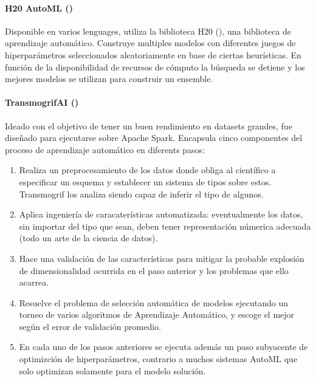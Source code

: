         \paragraph{H20 AutoML (\cite{ledell2020h2o})} Disponible en varios lenguages, utiliza la biblioteca H20 (\cite{boehmke2019hands}), una biblioteca de aprendizaje autom\'atico. Construye multiples modelos con diferentes juegos de hiperpar\'ametros seleccionados aleatoriamente en base de ciertas heur\'isticas. En funci\'on de la disponibilidad de recursos de c\'omputo la b\'usqueda se detiene y los mejores modelos se utilizan para construir un ensemble.

        \paragraph{TransmogrifAI (\cite{tovbin93meet})}  Ideado con el objetivo de tener un buen rendimiento en datasets grandes, fue dise\~nado para ejecutarse sobre Apache Spark. Encapsula cinco componentes del proceso de aprendizaje autom\'atico en diferents pasos:
        \begin{enumerate}
            \item Realiza un preprocesamiento de los datos donde obliga al cient\'ifico a especificar un esquema y establecer un sistema de tipos sobre estos. Transmogrif los analiza siendo capaz de inferir el tipo de algunos.
            \item Aplica ingenier\'ia de caracater\'isticas automatizada: eventualmente los datos, sin importar del tipo que sean, deben tener representaci\'on n\'umerica adecuada (todo un arte de la ciencia de datos).
            \item Hace una validaci\'on de las caracter\'isticas para mitigar  la probable explosi\'on de dimensionalidad ocurrida en el paso anterior y los problemas que ello acarrea.
            \item Resuelve el problema de selecci\'on autom\'atica de modelos ejecutando un torneo de varios algoritmos de Aprendizaje Autom\'atico, y escoge el mejor seg\'un el error de validaci\'on promedio.
            \item En cada uno de los pasos anteriores se ejecuta adem\'as un paso subyacente de optimizci\'on de hiperpar\'ametros, contrario a  muchos sistemas AutoML que solo optimizan solamente para el modelo soluci\'on. 
        \end{enumerate}


